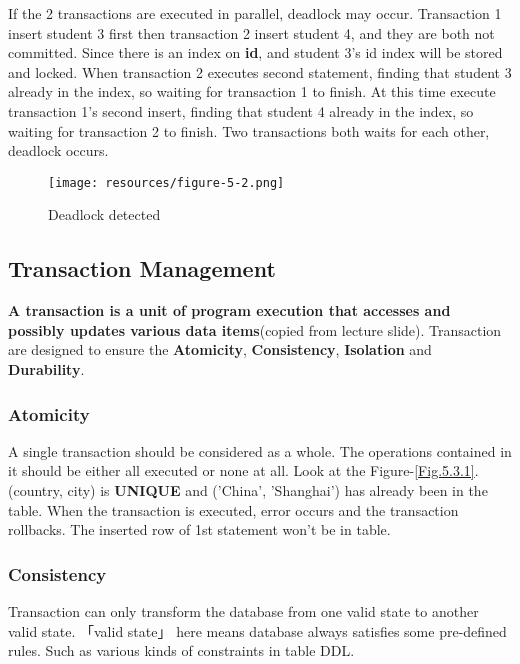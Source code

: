 \documentclass[onecolumn, oneside, ctexart, UTF8, b4paper]{SUSTechHomework}
\begin{document}
If the 2 transactions are executed in parallel, deadlock may occur. Transaction 1 insert student 3 first then transaction 2 insert student 4, and they are both not committed. Since there is an index on \textbf{id}, and student 3's id index will be stored and locked. When transaction 2 executes second statement, finding that student 3 already in the index, so waiting for transaction 1 to finish. At this time execute transaction 1's second insert, finding that student 4 already in the index, so waiting for transaction 2 to finish. Two transactions both waits for each other, deadlock occurs.

\begin{figure}[H]
    \centering
    \texttt{[image: resources/figure-5-2.png]}
    \caption{Deadlock detected}
    \label{fig.5.2}
\end{figure}

\subsection{\textbf{Transaction Management}}
 \textbf{A transaction is a unit of program execution that accesses and possibly updates various data items}(copied from lecture slide). Transaction are designed to ensure the \textbf{Atomicity}, \textbf{Consistency}, \textbf{Isolation} and \textbf{Durability}.

\subsubsection{\textbf{Atomicity}}
A single transaction should be considered as a whole. The operations contained in it should be either all executed or none at all. Look at the Figure-\ref{Fig.5.3.1}. (country, city) is \textbf{UNIQUE} and ('China', 'Shanghai') has already been in the table. When the transaction is executed, error occurs and the transaction rollbacks. The inserted row of 1st statement won't be in table.

\begin{figure}[H]
\centering
{}
\end{figure}

\subsubsection{\textbf{Consistency}}
Transaction can only transform the database from one valid state to another valid state.
「valid state」 here means database always satisfies some pre-defined rules. Such as various kinds of constraints in table DDL.
\end{document}
